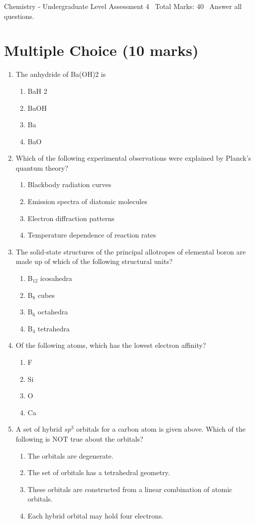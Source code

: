 \documentclass[12pt]{article}
\begin{document}
\begin{center}
Chemistry - Undergraduate Level Assessment 4 \
Total Marks: 40 \
Answer all questions.
\end{center}

\section*{Multiple Choice (10 marks)}
\begin{enumerate}[label=\arabic*.]
\item The anhydride of Ba(OH)2 is
\begin{enumerate}[label=(\alph*)]
    \item BaH 2
    \item BaOH
    \item Ba
    \item BaO
\end{enumerate}
\item Which of the following experimental observations were explained by Planck's quantum theory?
\begin{enumerate}[label=(\alph*)]
    \item Blackbody radiation curves
    \item Emission spectra of diatomic molecules
    \item Electron diffraction patterns
    \item Temperature dependence of reaction rates
\end{enumerate}
\item The solid-state structures of the principal allotropes of elemental boron are made up of which of the following structural units?
\begin{enumerate}[label=(\alph*)]
    \item B$_{12}$ icosahedra
    \item B$_{8}$ cubes
    \item B$_{6}$ octahedra
    \item B$_{4}$ tetrahedra
\end{enumerate}
\item Of the following atoms, which has the lowest electron affinity?
\begin{enumerate}[label=(\alph*)]
    \item F
    \item Si
    \item O
    \item Ca
\end{enumerate}
\item A set of hybrid $sp^3$ orbitals for a carbon atom is given above. Which of the following is NOT true about the orbitals?
\begin{enumerate}[label=(\alph*)]
    \item The orbitals are degenerate.
    \item The set of orbitals has a tetrahedral geometry.
    \item These orbitals are constructed from a linear combination of atomic orbitals.
    \item Each hybrid orbital may hold four electrons.
\end{enumerate}
\end{enumerate}
\end{document}
